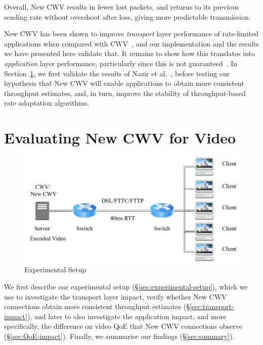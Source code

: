 \documentclass[10pt,sigconf]{acmart}
\begin{document}
Overall, New CWV results in fewer lost packets, and returns to its previous sending rate without overshoot after loss, giving more predictable transmission.

New CWV has been shown to improve \emph{transport} layer performance of rate-limited applications when compared with CWV~\cite{Nazir-2014-performance-evaluation-congestion-window-validation-dash-newcwv}, and our implementation and the results we have presented here validate that. It remains to show how this translates into \emph{application} layer performance, particularly since this is not guaranteed~\cite{Spiteri-2016-BOLA}. In Section~\ref{sec:evaluation}, we first validate the results of Nazir et al.~\cite{Nazir-2014-performance-evaluation-congestion-window-validation-dash-newcwv}, before testing our hypothesis that New CWV will enable applications to obtain more consistent throughput estimates, and, in turn, improve the stability of throughput-based rate adaptation algorithms.

\section{Evaluating New CWV for Video}
\label{sec:evaluation}

\begin{figure}
  \centering
  \includegraphics[width=.45\textwidth]{figures/setup.pdf}
  \caption{Experimental Setup}
  \label{fig:experimental-setup}
\end{figure}

We first describe our experimental setup (\S\ref{sec:experimental-setup}), which we use to investigate the transport layer impact, verify whether New CWV connections obtain more consistent throughput estimates (\S\ref{sec:transport-impact}), and later to also investigate the application impact, and more specifically, the difference on video QoE that New CWV connections observe (\S\ref{sec:QoE-impact}). Finally, we summarise our findings (\S\ref{sec:summary}).

\end{document}
